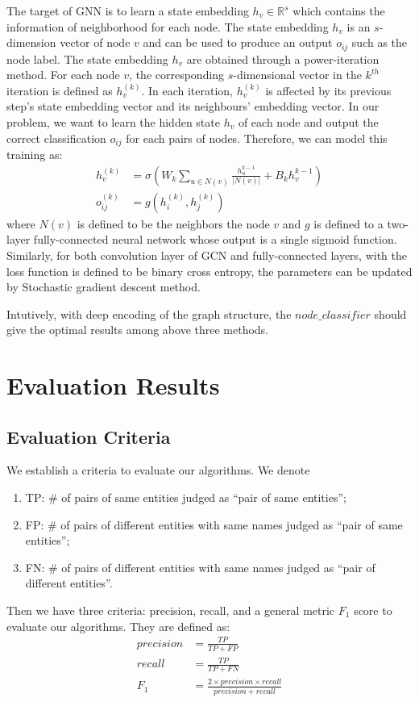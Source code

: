 \documentclass[sigconf, nonacm]{acmart}
\begin{document}
The target of GNN is to learn a state embedding $h_v\in \mathbb{R}^s$ which contains the information of neighborhood for each node. The state embedding $h_v$ is an $s$-dimension vector of node $v$ and can be used to produce an output $o_{ij}$ such as the node label. The state embedding $h_v$ are obtained through a power-iteration method. For each node $v$, the corresponding $s$-dimensional vector in the $k^{th}$ iteration is defined as $h_v^(k)$. In each iteration, $h_v^{(k)}$ is affected by its previous step's state embedding vector and its neighbours' embedding vector. In our problem, we want to learn the hidden state $h_v$ of each node and output the correct classification $o_{ij}$ for each pairs of nodes. Therefore, we can model this training as:
\begin{equation*}
    \begin{split}
h_v^{(k)}&=\sigma \left( W_k\sum\limits_{u\in N(v)}\frac{h_u^{k-1}}{|N(v)|}+B_kh_v^{k-1}\right)\\
o^{(k)}_{ij}&=g(h_i^{(k)},h_j^{(k)})
    \end{split}
\end{equation*}
where $N(v)$ is defined to be the neighbors the node $v$ and $g$ is defined to a two-layer fully-connected neural network whose output is a single sigmoid function. Similarly, for both convolution layer of GCN and fully-connected layers, with the loss function is defined to be binary cross entropy, the parameters can be updated by Stochastic gradient descent method.

Intutively, with deep encoding of the graph structure, the $node\_classifier$ should give the optimal results among above three methods.
\section{Evaluation Results}
\subsection{Evaluation Criteria}
We establish a criteria to evaluate our algorithms. We denote
\begin{enumerate}
    \item TP: \# of pairs of same entities judged as “pair of same entities”; 
    \item FP: \# of pairs of different entities with same names judged as “pair of same entities”;
    \item FN: \# of pairs of different entities with same names judged as “pair of different entities”. 
\end{enumerate}
Then we have three criteria: precision, recall, and a general metric $F_1$ score to evaluate our algorithms. They are defined as:
$$
\begin{aligned}precision &= \frac{TP}{TP + FP}\\recall &= \frac{TP}{TP + FN}\\
F_1 &= \frac{2\times precision \times  recall}{ precision + recall}
\end{aligned}
$$
\end{document}
